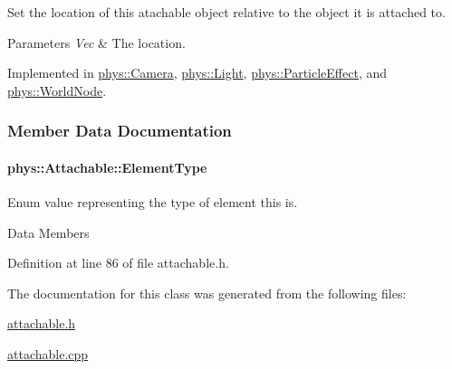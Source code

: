 Set the location of this atachable object relative to the object it is attached to. 


\begin{DoxyParams}{Parameters}
{\em Vec} & The location. \\
\hline
\end{DoxyParams}


Implemented in \hyperlink{classphys_1_1Camera_afd2a77e96dd6d0dec1071dcc3229425f}{phys::Camera}, \hyperlink{classphys_1_1Light_adf0d72c9ad1b0cff94bd7f4cba987750}{phys::Light}, \hyperlink{classphys_1_1ParticleEffect_a4371533c2d1d533208b7bc8a067a67e5}{phys::ParticleEffect}, and \hyperlink{classphys_1_1WorldNode_af276da0d87f4ddc1405bc87b9e2e034d}{phys::WorldNode}.



\subsubsection{Member Data Documentation}
\hypertarget{classphys_1_1Attachable_af574d5f08a304c6e0ae002bb2fc057c7}{
\paragraph[{ElementType}]{ {\bf phys::Attachable::ElementType}}\hfill}
\label{classphys_1_1Attachable_af574d5f08a304c6e0ae002bb2fc057c7}


Enum value representing the type of element this is. 

Data Members 

Definition at line 86 of file attachable.h.



The documentation for this class was generated from the following files:\begin{DoxyCompactItemize}
\item 
\hyperlink{attachable_8h}{attachable.h}\item 
\hyperlink{attachable_8cpp}{attachable.cpp}\end{DoxyCompactItemize}
